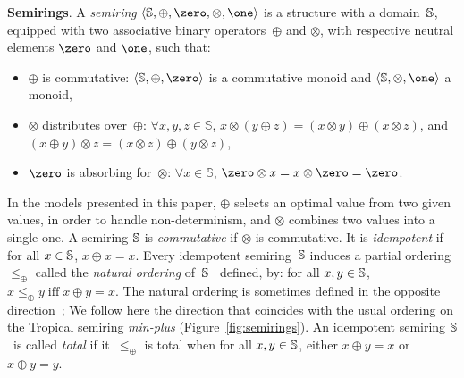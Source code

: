 %
\noindent
\textbf{Semirings}. A \emph{semiring} $\< \Semiring, \oplus, \zero, \otimes, \one>$
is a structure with a domain~$\mathbb{S}$,
equipped with two associative
binary operators~$\oplus$ and $\otimes$,
with respective neutral elements $\zero$ and $\one$, such that:
\begin{itemize}
\item $\oplus$ is commutative:
 $\< \Semiring, \oplus, \zero>$ is a commutative monoid
   and $\< \Semiring, \otimes, \one>$ a monoid,
\item $\otimes$ distributes over~$\oplus$:  $\forall x, y, z \in \mathbb{S}$,
$x \otimes (y \oplus z) = (x \otimes y) \oplus (x \otimes z)$,
and $(x \oplus y) \otimes z = (x \otimes z) \oplus (y \otimes z)$,
\item $\zero$ is absorbing for~$\otimes$:
$\forall x\in \mathbb{S}$, $\zero \otimes x = x \otimes \zero = \zero$.
\end{itemize}
%
In the models presented in this paper,
$\oplus$ selects an optimal value from two given values,
in order to handle non-determinism,
and $\otimes$ combines two values into a single one.
A semiring $\mathbb{S}$ is \emph{commutative} if $\otimes$ is commutative.
It is \emph{idempotent} if for all $x \in \mathbb{S}$, $x \oplus x = x$.
%
Every idempotent semiring~$\mathbb{S}$ induces
a partial ordering~$\leq_\oplus$
called the \emph{natural ordering} of~$\mathbb{S}$~\cite{Mohri02semiring}
defined,  by:
for all $x, y\in \mathbb{S}$,
$x \leq_\oplus y \;\mbox{iff}\; x \oplus y = x$.
%
The natural ordering is sometimes defined in the opposite direction~\cite{DrosteKuich09semirings};
We follow here the direction  %
that coincides with the usual ordering on the Tropical semiring \emph{min-plus}
(Figure~\ref{fig:semirings}).
%
\noindent
An idempotent semiring $\mathbb{S}$~is called \emph{total} if
it~$\leq_\oplus$ is total
\ie when for all $x, y \in \mathbb{S}$, either $x \oplus y = x$ or $x \oplus y = y$.

